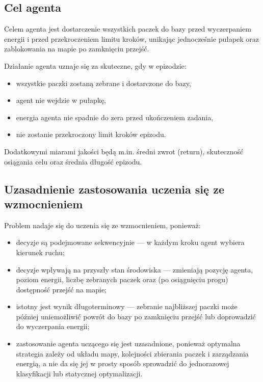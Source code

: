 \documentclass[12pt]{article}
\begin{document}
\subsection{Cel agenta}

Celem agenta jest dostarczenie wszystkich paczek do bazy przed wyczerpaniem energii
i przed przekroczeniem limitu kroków, unikając jednocześnie pułapek oraz zablokowania
na mapie po zamknięciu przejść.

Działanie agenta uznaje się za skuteczne, gdy w epizodzie:
\begin{itemize}
    \item wszystkie paczki zostaną zebrane i dostarczone do bazy,
    \item agent nie wejdzie w pułapkę,
    \item energia agenta nie spadnie do zera przed ukończeniem zadania,
    \item nie zostanie przekroczony limit kroków epizodu.
\end{itemize}

Dodatkowymi miarami jakości będą m.in. średni zwrot (return), skuteczność osiągania celu
oraz średnia długość epizodu.

\subsection{Uzasadnienie zastosowania uczenia się ze wzmocnieniem}

Problem nadaje się do uczenia się ze wzmocnieniem, ponieważ:
\begin{itemize}
    \item decyzje są podejmowane sekwencyjnie --- w każdym kroku agent wybiera kierunek ruchu;
    \item decyzje wpływają na przyszły stan środowiska --- zmieniają pozycję agenta, poziom energii,
    liczbę zebranych paczek oraz (po osiągnięciu progu) dostępność przejść na mapie;
    \item istotny jest wynik długoterminowy --- zebranie najbliższej paczki może później uniemożliwić
    powrót do bazy po zamknięciu przejść lub doprowadzić do wyczerpania energii;
    \item zastosowanie agenta uczącego się jest uzasadnione, ponieważ optymalna strategia zależy
    od układu mapy, kolejności zbierania paczek i zarządzania energią, a nie da się jej w prosty sposób
    sprowadzić do jednorazowej klasyfikacji lub statycznej optymalizacji.
\end{itemize}
\end{document}

